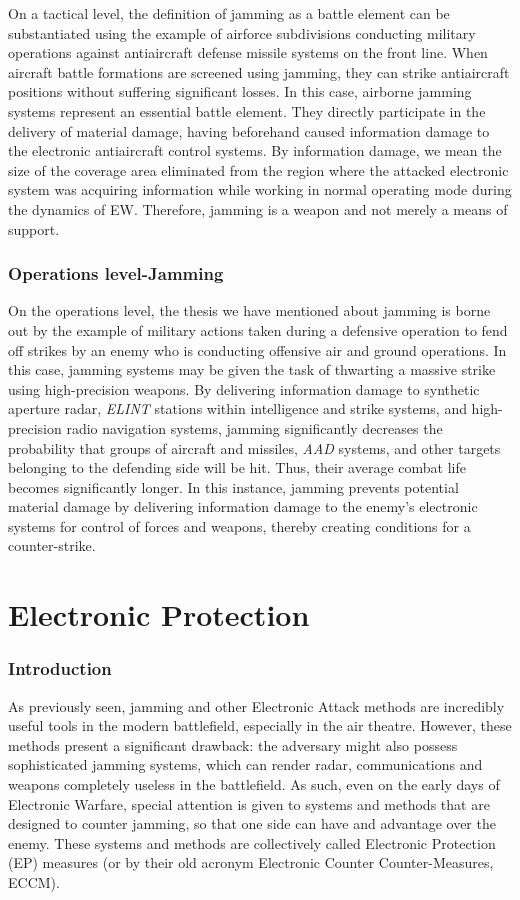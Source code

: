 \documentclass[english,purist]{ist-report}
\begin{document}
On a tactical level, the definition of jamming as a battle element can be substantiated using the example of airforce subdivisions conducting military operations against antiaircraft defense missile systems on the front line. When aircraft battle formations are screened using jamming, they can strike antiaircraft positions without suffering significant losses. In this case, airborne jamming systems represent an essential battle element. They directly participate in the delivery of material damage, having beforehand caused information damage to the electronic antiaircraft control systems.
By information damage, we mean the size of the coverage area eliminated from the region where the attacked electronic system was acquiring information while working in normal operating mode during the dynamics of EW. Therefore, jamming is a weapon and not merely a
means of support. 

\section{Operations level-Jamming}
On the operations level, the thesis we have mentioned about jamming
is borne out by the example of military actions taken during a defensive operation to fend off strikes by an enemy who is conducting offensive air and ground operations. In this case, jamming systems may be given the task of thwarting a massive strike using high-precision weapons. By delivering information damage to synthetic aperture radar, \textit{ELINT} stations within intelligence and strike systems, and high-precision radio navigation systems, jamming significantly decreases the probability that groups of aircraft and
missiles, \textit{AAD} systems, and other targets belonging to the defending side will be hit. Thus, their average combat life becomes significantly longer. In this instance, jamming prevents potential material damage by delivering information damage to the enemy's electronic systems for control of forces and weapons, thereby creating conditions for a counter-strike. 

\pagebreak
\part{Electronic Protection}
\section{Introduction}

As previously seen, jamming and other Electronic Attack methods are incredibly useful tools in the modern battlefield, especially in the air theatre. However, these methods present a significant drawback: the adversary might also possess sophisticated jamming systems, which can render radar, communications and weapons completely useless in the battlefield. As such, even on the early days of Electronic Warfare, special attention is given to systems and methods that are designed to counter jamming, so that one side can have and advantage over the enemy. These systems and methods are collectively called Electronic Protection (EP) measures (or by their old acronym Electronic Counter Counter-Measures, ECCM). 
\end{document}
